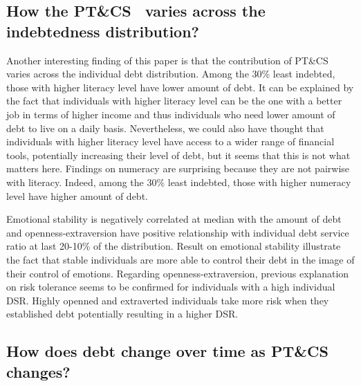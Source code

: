 \documentclass[a4paper, 12pt, onecolumn]{article}
\newcommand{\PTCS}{PT\&CS}
\begin{document}
	\subsection{How the \PTCS~ varies across the indebtedness distribution?}

Another interesting finding of this paper is that the contribution of \PTCS~ varies across the individual debt distribution.
Among the 30\% least indebted, those with higher literacy level have lower amount of debt.
It can be explained by the fact that individuals with higher literacy level can be the one with a better job in terms of higher income and thus individuals who need lower amount of debt to live on a daily basis. 
Nevertheless, we could also have thought that individuals with higher literacy level have access to a wider range of financial tools, potentially increasing their level of debt, but it seems that this is not what matters here.
Findings on numeracy are surprising because they are not pairwise with literacy.
Indeed, among the 30\% least indebted, those with higher numeracy level have higher amount of debt.

Emotional stability is negatively correlated at median with the amount of debt and openness-extraversion have positive relationship with individual debt service ratio at last 20-10\% of the distribution.
Result on emotional stability illustrate the fact that stable individuals are more able to control their debt in the image of their control of emotions.
Regarding openness-extraversion, previous explanation on risk tolerance seems to be confirmed for individuals with a high individual DSR. 
Highly openned and extraverted individuals take more risk when they established debt potentially resulting in a higher DSR.


	\subsection{How does debt change over time as \PTCS~ changes?}
\end{document}
